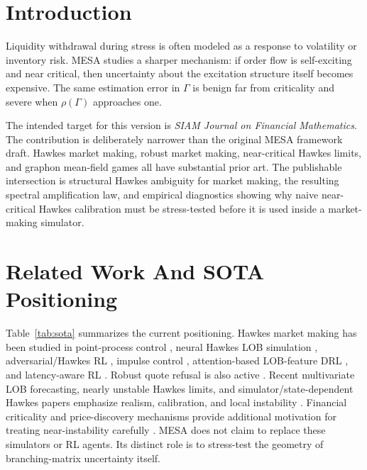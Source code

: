 \documentclass[review]{siamonline250211}
\begin{document}
\section{Introduction}

Liquidity withdrawal during stress is often modeled as a response to volatility
or inventory risk. MESA studies a sharper mechanism: if order flow is
self-exciting and near critical, then uncertainty about the excitation
structure itself becomes expensive. The same estimation error in $\Gamma$ is
benign far from criticality and severe when $\rho(\Gamma)$ approaches one.

The intended target for this version is \emph{SIAM Journal on Financial
Mathematics}. The contribution is deliberately narrower than the original MESA
framework draft. Hawkes market making, robust market making, near-critical
Hawkes limits, and graphon mean-field games all have substantial prior art. The
publishable intersection is structural Hawkes ambiguity for market making, the
resulting spectral amplification law, and empirical diagnostics showing why
naive near-critical Hawkes calibration must be stress-tested before it is used
inside a market-making simulator.

\section{Related Work And SOTA Positioning}

Table~\ref{tab:sota} summarizes the current positioning. Hawkes market making
has been studied in point-process control \cite{LawViens2019}, neural Hawkes
LOB simulation \cite{LalorSwishchuk2025,Kumar2024}, adversarial/Hawkes RL
\cite{WangHawkesARL2025}, impulse control \cite{Jain2025}, attention-based
LOB-feature DRL \cite{GuoAttnLOB2023}, and latency-aware
RL \cite{Jiang2025}. Robust quote refusal is also active
\cite{WangNoQuote2025}. Recent multivariate LOB forecasting, nearly unstable
Hawkes limits, and simulator/state-dependent Hawkes papers emphasize realism,
calibration, and local instability
\cite{Raffaelli2026,SzymanskiXu2025,ElKarmi2026,ElKarmiSimulator2025,Noble2026,Kimura2026}.
Financial criticality and price-discovery mechanisms provide additional
motivation for treating near-instability carefully
\cite{Hardiman2013,Kang2026}. MESA does not claim to replace these simulators
or RL agents. Its distinct role is to stress-test the geometry of
branching-matrix uncertainty itself.
\end{document}
